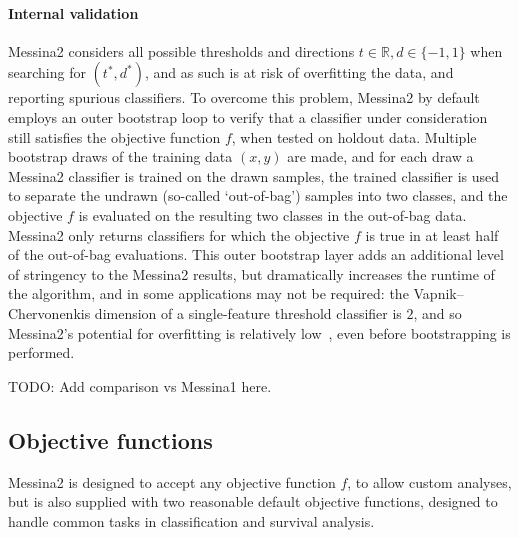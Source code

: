 \documentclass[dissertation.tex]{subfiles}
\begin{document}
\paragraph{Internal validation}
Messina2 considers all possible thresholds and directions $t \in \mathbb{R}, d \in \{-1,1\}$ when searching for $(t^*, d^*)$, and as such is at risk of overfitting the data, and reporting spurious classifiers.  To overcome this problem, Messina2 by default employs an outer bootstrap loop to verify that a classifier under consideration still satisfies the objective function $f$, when tested on holdout data.  Multiple bootstrap draws of the training data $(x, y)$ are made, and for each draw a Messina2 classifier is trained on the drawn samples, the trained classifier is used to separate the undrawn (so-called `out-of-bag') samples into two classes, and the objective $f$ is evaluated on the resulting two classes in the out-of-bag data.  Messina2 only returns classifiers for which the objective $f$ is $\mathrm{true}$ in at least half of the out-of-bag evaluations.  This outer bootstrap layer adds an additional level of stringency to the Messina2 results, but dramatically increases the runtime of the algorithm, and in some applications may not be required: the Vapnik–Chervonenkis dimension of a single-feature threshold classifier is $2$, and so Messina2's potential for overfitting is relatively low~\cite{Vapnik1999}, even before bootstrapping is performed.

TODO: Add comparison vs Messina1 here.

\subsection{Objective functions}
Messina2 is designed to accept any objective function $f$, to allow custom analyses, but is also supplied with two reasonable default objective functions, designed to handle common tasks in classification and survival analysis.
\end{document}
